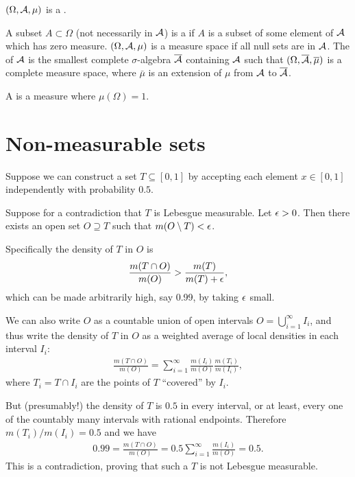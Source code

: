 $(\Omega, \mathcal A, \mu)$ is a .

A subset $A \subset \Omega$ (not necessarily in $\mathcal A$) is a  if $A$ is a subset of some element
of $\mathcal A$ which has zero measure. $(\Omega, \mathcal A, \mu)$ is a  measure space if all null sets are
in $\mathcal A$. The  of $\mathcal A$ is the smallest complete $\sigma$-algebra $\overline{\mathcal A}$ containing
$\mathcal A$ such that $(\Omega, \overline{\mathcal A}, \overline \mu)$ is a complete measure space, where $\bar \mu$ is an
extension of $\mu$ from $\mathcal A$ to $\overline{\mathcal A}$.

A  is a measure where $\mu(\Omega) = 1$.

\section{Non-measurable sets}

\newpage
\begin{example}

  Suppose we can construct a set $T \subseteq [0, 1]$ by accepting each element $x \in [0, 1]$ independently
  with probability $0.5$.

  Suppose for a contradiction that $T$ is Lebesgue measurable. Let $\epsilon > 0$. Then there exists an open
  set $O \supseteq T$ such that $m(O \setminus T) < \epsilon$.

  Specifically the density of $T$ in $O$ is
  \begin{align*}
    \frac{m(T \cap O)}{m(O)} > \frac{m(T)}{m(T) + \epsilon},
  \end{align*}
  which can be made arbitrarily high, say 0.99, by taking $\epsilon$ small.

  We can also write $O$ as a countable union of open intervals $O = \bigcup_{i=1}^\infty I_i$, and thus write
  the density of $T$ in $O$ as a weighted average of local densities in each interval $I_i$:
  \begin{align*}
    \frac{m(T \cap O)}{m(O)} = \sum_{i=1}^\infty \frac{m(I_i)}{m(O)} \frac{m(T_i)}{m(I_i)},
  \end{align*}
  where $T_i = T \cap I_i$ are the points of $T$ ``covered​'' by $I_i$.

  But (presumably!) the density of $T$ is $0.5$ in every interval, or at least, every one of the countably many
  intervals with rational endpoints. Therefore $m(T_i)/m(I_i) = 0.5$ and we have
  \begin{align*}
    0.99 = \frac{m(T \cap O)}{m(O)} = 0.5\sum_{i=1}^\infty \frac{m(I_i)}{m(O)} = 0.5.
  \end{align*}
  This is a contradiction, proving that such a $T$ is not Lebesgue measurable.
\end{example}


